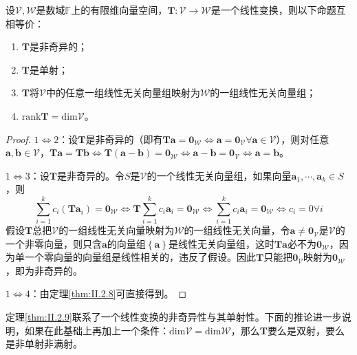 \documentclass[main.tex]{subfiles}
\begin{document}
\begin{theorem}\label{thm:II.2.9}
    设$\mathcal{V},\mathcal{W}$是数域$\mathbb{F}$上的有限维向量空间，$\mathbf{T}:\mathcal{V}\rightarrow\mathcal{W}$是一个线性变换，则以下命题互相等价：
    \begin{enumerate}
        \item $\mathbf{T}$是非奇异的；
        \item $\mathbf{T}$是单射；
        \item $\mathbf{T}$将$\mathcal{V}$中的任意一组线性无关向量组映射为$\mathcal{W}$的一组线性无关向量组；
        \item $\mathrm{rank}\mathbf{T}=\mathrm{dim}\mathcal{V}$。
    \end{enumerate}
\end{theorem}
\begin{proof}
    $1\Leftrightarrow 2$：设$\mathbf{T}$是非奇异的（即有$\mathbf{Ta}=\mathbf{0}_\mathcal{W}\Leftrightarrow\mathbf{a}=\mathbf{0}_\mathcal{V}\forall\mathbf{a}\in\mathcal{V}$），则对任意$\mathbf{a},\mathbf{b}\in\mathcal{V}$，$\mathbf{Ta}=\mathbf{Tb}\Leftrightarrow\mathbf{T}\left(\mathbf{a}-\mathbf{b}\right)=\mathbf{0}_\mathcal{W}\Leftrightarrow\mathbf{a}-\mathbf{b}=\mathbf{0}_\mathcal{V}\Leftrightarrow\mathbf{a}=\mathbf{b}$。

    $1\Leftrightarrow 3$：设$\mathbf{T}$是非奇异的。令$S$是$\mathcal{V}$的一个线性无关向量组，如果向量$\mathbf{a}_1,\cdots,\mathbf{a}_k\in S$，则
    \[
        \sum_{i=1}^kc_i\left(\mathbf{Ta}_i\right)=\mathbf{0}_\mathcal{W}\Leftrightarrow\mathbf{T}\sum_{i=1}^kc_i\mathbf{a}_i=\mathbf{0}_\mathcal{W}\Leftrightarrow\sum_{i=1}^kc_i\mathbf{a}_i=\mathbf{0}_\mathcal{W}\Leftrightarrow c_i=0\forall i
    \]
    假设$\mathbf{T}$总把$\mathcal{V}$的一组线性无关向量映射为$\mathcal{W}$的一组线性无关向量，令$\mathbf{a}\neq\mathbf{0}_\mathcal{V}$是$\mathcal{V}$的一个非零向量，则只含$\mathbf{a}$的向量组$\left\{\mathbf{a}\right\}$是线性无关向量组，这时$\mathbf{Ta}$必不为$\mathbf{0}_\mathcal{W}$，因为单一个零向量的向量组是线性相关的，违反了假设。因此$\mathbf{T}$只能把$\mathbf{0}_\mathcal{V}$映射为$\mathbf{0}_\mathcal{W}$，即为非奇异的。

    $1\Leftrightarrow 4$：由定理\ref{thm:II.2.8}可直接得到。
\end{proof}

定理\ref{thm:II.2.9}联系了一个线性变换的非奇异性与其单射性。下面的推论进一步说明，如果在此基础上再加上一个条件：$\mathrm{dim}\mathcal{V}=\mathrm{dim}\mathcal{W}$，那么$\mathbf{T}$要么是双射，要么是非单射非满射。
\end{document}
